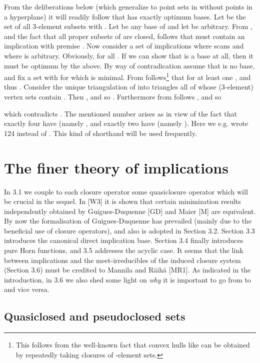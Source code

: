 \documentclass[11pt]{article}
\begin{document}
From the deliberations below (which generalize to point sets in  without  points in a hyperplane) it will readily follow that  has exactly  optimum bases. 
Let  be the set of all 3-element subsets  with .
Let  be any base of  and let  be arbitrary. From , and the fact that all proper subsets of  are closed, follows that  must contain an implication with premise . Now consider a set  of implications  where  scans  and where  is arbitrary. Obviously,  for all . If we can show that  is a base at all, then it must be optimum by the above. By way of contradication assume that  is no base, and fix a set  with  for which  is minimal. From  follows\footnote{This follows from the well-known fact that convex hulls like  can be obtained by repeatedly taking closures of -element sets.} that  for at least one , and thus . Consider the unique triangulation of  into triangles  all of whose (3-element) vertex sets  contain . Then , and so . Furthermore from  follows , and so


which contradicts .  The mentioned number  arises as  in view of the fact that exactly four  have  (namely , and exactly two  have   (namely ). Here we e.g. wrote 124 instead of . This kind of shorthand will be used frequently.




\section{The finer theory of implications}

In 3.1 we couple to each closure operator  some quasiclosure operator   which will be crucial in the sequel. In [W3] it is shown that certain minimization results independently obtained by Guigues-Duquenne [GD] and Maier [M] are equivalent. By now the formalisation of Guigues-Duquenne has prevailed (mainly due to the beneficial use of closure operators), and also is adopted in Section 3.2. Section 3.3 introduces the canonical direct implication base. Section 3.4 finally introduces pure Horn functions, and 3.5 addresses the acyclic case. 
It seems that the link between implications and the meet-irreducibles of the induced closure system (Section 3.6) must be credited to Mannila and R\"{a}ih\"{a} [MR1]. As indicated in the introduction, in 3.6 we also shed some light on {\it why} it is important to go from  to  and vice versa.


\subsection{Quasiclosed and pseudoclosed sets}
\end{document}
